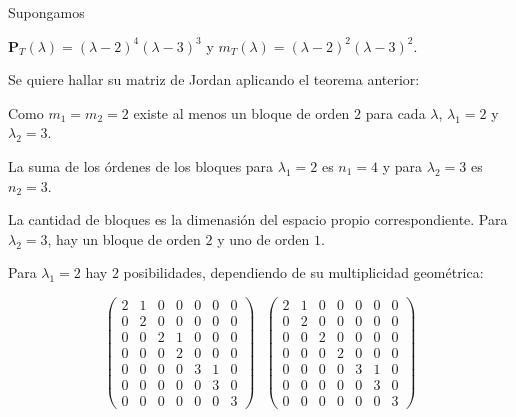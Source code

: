 \bigskip

\begin{example}



Supongamos 

\bigskip

$\mathbf{P}_T(\lambda)=(\lambda-2)^{4} (\lambda-3)^{3}$  y $m_T(\lambda)=(\lambda-2)^{2} (\lambda-3)^{2}$.

\bigskip


Se quiere hallar su matriz de Jordan aplicando el teorema anterior:

\bigskip

\bigskip

Como $m_1=m_2=2$ existe al menos un bloque de orden $2$ para cada $\lambda$,  $\lambda_1=2$ y  $\lambda_2=3$.

\bigskip

La suma de los órdenes de los bloques para  $\lambda_1=2$ es $n_1=4$ y para $\lambda_2=3$  es $n_2=3$.

\bigskip

La cantidad de bloques es la dimenasión del espacio propio correspondiente. Para $\lambda_2=3$, hay un bloque de orden $2$ y uno de orden $1$.

\bigskip

Para $\lambda_1=2$ hay $2$ posibilidades, dependiendo de su multiplicidad geométrica:

\bigskip

$$\left(\begin{array}{ccccccc} 2 & 1 &  0 & 0  & 0 &  0 & 0 \\ 0   & 2 & 0 & 0 & 0 &  0 & 0 
\\  0 & 0 &  2  & 1 & 0 &  0 & 0 \\ 0 & 0 & 0 & 2 & 0 &  0 & 0 \\  0 & 0 & 0 & 0 & 3 &  1 & 0 \\  0 & 0 & 0 & 0 & 0 &  3 & 0 \\  0 & 0 & 0 & 0 & 0 &  0 & 3 
\end{array}
 \right)~~~\left(\begin{array}{ccccccc} 2 & 1 &  0 & 0  & 0 &  0 & 0 \\ 0   & 2 & 0 & 0 & 0 &  0 & 0 
\\  0 & 0 &  2  & 0 & 0 &  0 & 0 \\ 0 & 0 & 0 & 2 & 0 &  0 & 0 \\  0 & 0 & 0 & 0 & 3 &  1 & 0 \\  0 & 0 & 0 & 0 & 0 &  3 & 0 \\  0 & 0 & 0 & 0 & 0 &  0 & 3 
\end{array}
 \right)$$




\end{example}

